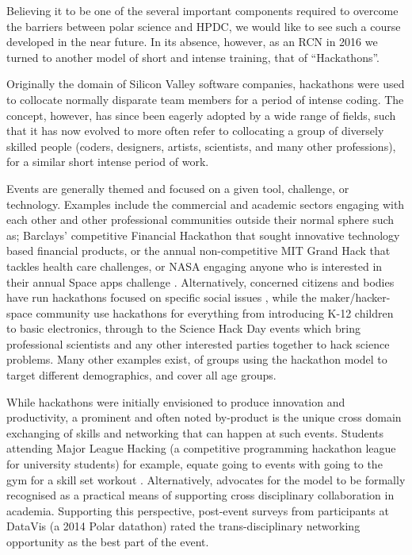 \documentclass[conference]{IEEEtran}
\begin{document}
Believing it to be one of the several important components required to overcome the barriers between polar science and HPDC, we would like to see such a course developed in the near future. In its absence, however, as an RCN in 2016 we turned to another model of short and intense training, that of ``Hackathons''. 

Originally the domain of Silicon Valley software companies, hackathons were used to collocate normally disparate team members for a period of intense coding. The concept, however, has since been eagerly adopted by a wide range of fields, such that it has now evolved to more often refer to collocating a group of diversely skilled people (coders, designers, artists, scientists, and many other professions), for a similar short intense period of work.  

Events are generally themed and focused on a given tool, challenge, or technology. Examples include the commercial and academic sectors engaging with each other and other professional communities outside their normal sphere such as; Barclays' competitive Financial Hackathon\cite{noauthor_undated-rc} that sought innovative technology based financial products, or the annual non-competitive MIT Grand Hack \cite{noauthor_undated-zx} that tackles health care challenges, or NASA engaging anyone who is interested in their annual Space apps challenge \cite{noauthor_undated-rb}.  Alternatively, concerned citizens and bodies have run hackathons focused on specific social issues \cite{noauthor_undated-qo,noauthor_undated-vs}, while the maker/hacker-space community use hackathons for everything from introducing K-12 children to basic electronics\cite{Aboab2016-tk}, through to the Science Hack Day \cite{noauthor_undated-qs} events which bring professional scientists and any other interested parties together to hack science problems.  Many other examples exist, of groups using the hackathon model to target different demographics, and cover all age groups.  

While hackathons were initially envisioned to produce innovation and productivity, a prominent and often noted by-product is the unique cross domain exchanging of skills and networking that can happen at such events. Students attending Major League Hacking \cite{noauthor_undated-tz} (a competitive programming hackathon league for university students) for example, equate going to events with going to the gym for a skill set workout \cite{Leckart2015-go}.  Alternatively, \cite{Aboab2016-tk} advocates for the model to be formally recognised as a practical means of supporting cross disciplinary collaboration in academia. Supporting this perspective, post-event surveys from participants at DataVis \cite{noauthor_undated-mn} (a 2014 Polar datathon) rated the trans-disciplinary networking opportunity as the best part of the event.
\end{document}
